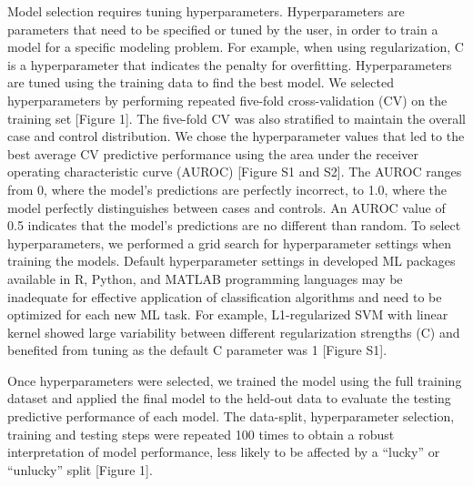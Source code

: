 \documentclass[11pt,]{article}
\begin{document}
Model selection requires tuning hyperparameters. Hyperparameters are
parameters that need to be specified or tuned by the user, in order to
train a model for a specific modeling problem. For example, when using
regularization, C is a hyperparameter that indicates the penalty for
overfitting. Hyperparameters are tuned using the training data to find
the best model. We selected hyperparameters by performing repeated
five-fold cross-validation (CV) on the training set {[}Figure 1{]}. The
five-fold CV was also stratified to maintain the overall case and
control distribution. We chose the hyperparameter values that led to the
best average CV predictive performance using the area under the receiver
operating characteristic curve (AUROC) {[}Figure S1 and S2{]}. The AUROC
ranges from 0, where the model's predictions are perfectly incorrect, to
1.0, where the model perfectly distinguishes between cases and controls.
An AUROC value of 0.5 indicates that the model's predictions are no
different than random. To select hyperparameters, we performed a grid
search for hyperparameter settings when training the models. Default
hyperparameter settings in developed ML packages available in R, Python,
and MATLAB programming languages may be inadequate for effective
application of classification algorithms and need to be optimized for
each new ML task. For example, L1-regularized SVM with linear kernel
showed large variability between different regularization strengths (C)
and benefited from tuning as the default C parameter was 1 {[}Figure
S1{]}.

Once hyperparameters were selected, we trained the model using the full
training dataset and applied the final model to the held-out data to
evaluate the testing predictive performance of each model. The
data-split, hyperparameter selection, training and testing steps were
repeated 100 times to obtain a robust interpretation of model
performance, less likely to be affected by a ``lucky'' or ``unlucky''
split {[}Figure 1{]}.
\end{document}
